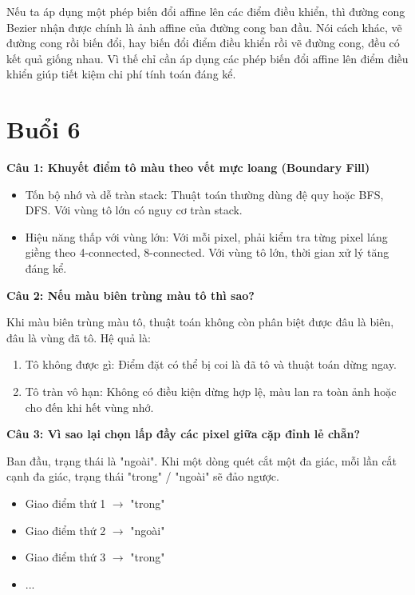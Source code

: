 Nếu ta áp dụng một phép biến đổi affine lên các điểm điều khiển, thì đường cong Bezier nhận được chính là ảnh affine của đường cong ban đầu. Nói cách khác, vẽ đường cong rồi biến đổi, hay biến đổi điểm điều khiển rồi vẽ đường cong, đều có kết quả giống nhau. Vì thế chỉ cần áp dụng các phép biến đổi affine lên điểm điều khiển giúp tiết kiệm chi phí tính toán đáng kể.

\section{Buổi 6}

\textbf{Câu 1: Khuyết điểm tô màu theo vết mực loang (Boundary Fill)}
\begin{itemize}
	\item Tốn bộ nhớ và dễ tràn stack: Thuật toán thường dùng đệ quy hoặc BFS, DFS. Với vùng tô lớn có nguy cơ tràn stack.
	
	\item Hiệu năng thấp với vùng lớn: Với mỗi pixel, phải kiểm tra từng pixel láng giềng theo 4-connected, 8-connected. Với vùng tô lớn, thời gian xử lý tăng đáng kể.
\end{itemize}

\textbf{Câu 2: Nếu màu biên trùng màu tô thì sao?}

Khi màu biên trùng màu tô, thuật toán không còn phân biệt được đâu là biên, đâu là vùng đã tô. Hệ quả là:
\begin{enumerate}
	\item Tô không được gì: Điểm đặt có thể bị coi là đã tô và thuật toán dừng ngay.
	
	\item Tô tràn vô hạn: Không có điều kiện dừng hợp lệ, màu lan ra toàn ảnh hoặc cho đến khi hết vùng nhớ.
\end{enumerate}

\textbf{Câu 3: Vì sao lại chọn lấp đầy các pixel giữa cặp đỉnh lẻ chẵn?}

Ban đầu, trạng thái là "ngoài". Khi một dòng quét cắt một đa giác, mỗi lần cắt cạnh đa giác, trạng thái "trong" / "ngoài" sẽ đảo ngược.

\begin{itemize}
	\item Giao điểm thứ 1 $\rightarrow$ "trong"
	
	\item Giao điểm thứ 2 $\rightarrow$ "ngoài"
	
	\item Giao điểm thứ 3 $\rightarrow$ "trong"
	
	\item ...
\end{itemize}


